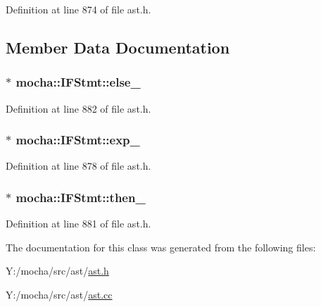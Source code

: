 Definition at line 874 of file ast.h.



\subsection{Member Data Documentation}
\hypertarget{classmocha_1_1_i_f_stmt_a8b19632e07f3d8215159a41aed45547c}{
\subsubsection[{else\_\-}]{$\ast$ {\bf mocha::IFStmt::else\_\-}}}
\label{classmocha_1_1_i_f_stmt_a8b19632e07f3d8215159a41aed45547c}


Definition at line 882 of file ast.h.

\hypertarget{classmocha_1_1_i_f_stmt_aa710b83ea9cc7163eb831a7c950ed193}{
\subsubsection[{exp\_\-}]{$\ast$ {\bf mocha::IFStmt::exp\_\-}}}
\label{classmocha_1_1_i_f_stmt_aa710b83ea9cc7163eb831a7c950ed193}


Definition at line 878 of file ast.h.

\hypertarget{classmocha_1_1_i_f_stmt_aec15abfd3458f3b54ff132b9c6108120}{
\subsubsection[{then\_\-}]{$\ast$ {\bf mocha::IFStmt::then\_\-}}}
\label{classmocha_1_1_i_f_stmt_aec15abfd3458f3b54ff132b9c6108120}


Definition at line 881 of file ast.h.



The documentation for this class was generated from the following files:\begin{DoxyCompactItemize}
\item 
Y:/mocha/src/ast/\hyperlink{ast_8h}{ast.h}\item 
Y:/mocha/src/ast/\hyperlink{ast_8cc}{ast.cc}\end{DoxyCompactItemize}
